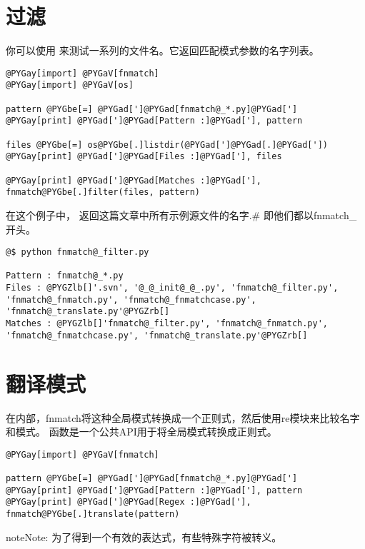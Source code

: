 \documentclass[a4paper,10pt,english]{manual}
\begin{document}
\section{过滤}

你可以使用  来测试一系列的文件名。它返回匹配模式参数的名字列表。

\begin{Verbatim}[commandchars=@\[\]]
@PYGay[import] @PYGaV[fnmatch]
@PYGay[import] @PYGaV[os]

pattern @PYGbe[=] @PYGad[']@PYGad[fnmatch@_*.py]@PYGad[']
@PYGay[print] @PYGad[']@PYGad[Pattern :]@PYGad['], pattern

files @PYGbe[=] os@PYGbe[.]listdir(@PYGad[']@PYGad[.]@PYGad['])
@PYGay[print] @PYGad[']@PYGad[Files :]@PYGad['], files

@PYGay[print] @PYGad[']@PYGad[Matches :]@PYGad['], fnmatch@PYGbe[.]filter(files, pattern)
\end{Verbatim}

在这个例子中，  返回这篇文章中所有示例源文件的名字.\# 即他们都以fnmatch\_开头。

\begin{Verbatim}[commandchars=@\[\]]
@$ python fnmatch@_filter.py

Pattern : fnmatch@_*.py
Files : @PYGZlb[]'.svn', '@_@_init@_@_.py', 'fnmatch@_filter.py', 'fnmatch@_fnmatch.py', 'fnmatch@_fnmatchcase.py', 'fnmatch@_translate.py'@PYGZrb[]
Matches : @PYGZlb[]'fnmatch@_filter.py', 'fnmatch@_fnmatch.py', 'fnmatch@_fnmatchcase.py', 'fnmatch@_translate.py'@PYGZrb[]
\end{Verbatim}


\section{翻译模式}

在内部，fnmatch将这种全局模式转换成一个正则式，然后使用re模块来比较名字和模式。  函数是一个公共API用于将全局模式转换成正则式。

\begin{Verbatim}[commandchars=@\[\]]
@PYGay[import] @PYGaV[fnmatch]

pattern @PYGbe[=] @PYGad[']@PYGad[fnmatch@_*.py]@PYGad[']
@PYGay[print] @PYGad[']@PYGad[Pattern :]@PYGad['], pattern
@PYGay[print] @PYGad[']@PYGad[Regex :]@PYGad['], fnmatch@PYGbe[.]translate(pattern)
\end{Verbatim}

\begin{notice}{note}{Note:}
为了得到一个有效的表达式，有些特殊字符被转义。
\end{notice}
\end{document}
